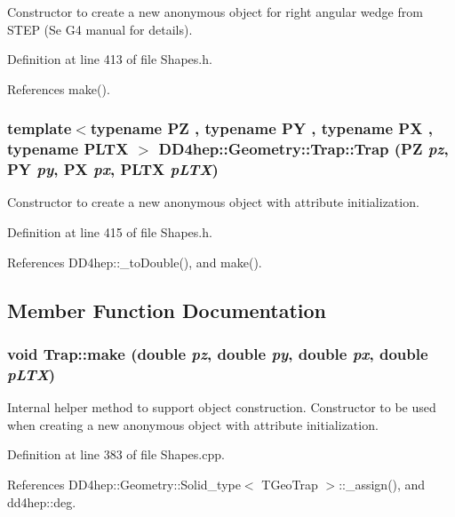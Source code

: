 Constructor to create a new anonymous object for right angular wedge from STEP (Se G4 manual for details). 

Definition at line 413 of file Shapes.h.

References make().\hypertarget{class_d_d4hep_1_1_geometry_1_1_trap_a6f5daa770e696990488a37cd5c85008c}{
\subsubsection[{Trap}]{\setlength{\rightskip}{0pt plus 5cm}template$<$typename PZ , typename PY , typename PX , typename PLTX $>$ DD4hep::Geometry::Trap::Trap (PZ {\em pz}, \/  PY {\em py}, \/  PX {\em px}, \/  PLTX {\em pLTX})}}
\label{class_d_d4hep_1_1_geometry_1_1_trap_a6f5daa770e696990488a37cd5c85008c}


Constructor to create a new anonymous object with attribute initialization. 

Definition at line 415 of file Shapes.h.

References DD4hep::\_\-toDouble(), and make().

\subsection{Member Function Documentation}
\hypertarget{class_d_d4hep_1_1_geometry_1_1_trap_a2dcf7eee64e3128d22a35d1b1f872cf9}{
\subsubsection[{make}]{\setlength{\rightskip}{0pt plus 5cm}void Trap::make (double {\em pz}, \/  double {\em py}, \/  double {\em px}, \/  double {\em pLTX})}}
\label{class_d_d4hep_1_1_geometry_1_1_trap_a2dcf7eee64e3128d22a35d1b1f872cf9}


Internal helper method to support object construction. Constructor to be used when creating a new anonymous object with attribute initialization. 

Definition at line 383 of file Shapes.cpp.

References DD4hep::Geometry::Solid\_\-type$<$ TGeoTrap $>$::\_\-assign(), and dd4hep::deg.

